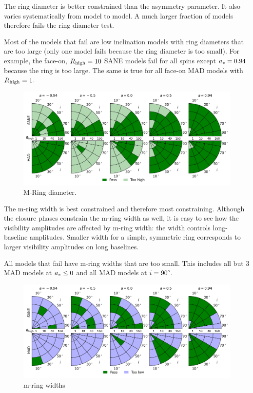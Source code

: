 
The ring diameter is better constrained than the asymmetry parameter.  It also varies systematically from model to model.  A much larger fraction of models therefore fails the ring diameter test.

Most of the models that fail are low inclination models with ring diameters that are too large (only one model fails because the ring diameter is too small).  For example, the face-on, $R_\mathrm{high} = 10$ SANE models fail for all spins except $a_* = 0.94$ because the ring is too large.  The same is true for all face-on MAD models with $R_\mathrm{high} = 1$.

\begin{figure}
  \centering
  \includegraphics[width=\textwidth]{./figures/Mring_d_Constraints.png}
  \caption{M-Ring diameter.}
  \label{fig:cmp_m-ring_diam}
\end{figure}

The m-ring width is best constrained and therefore most constraining.  Although the closure phases constrain the m-ring width as well, it is easy to see how the visibility amplitudes are affected by m-ring width: the width controls long-baseline amplitudes. Smaller width for a simple, symmetric ring corresponds to larger visibility amplitudes on long baselines.

All models that fail have m-ring widths that are too small.  This includes all but 3 MAD models at $a_* \le 0$ and all MAD models at $i = 90\degree$.

\begin{figure}
 \centering
 \includegraphics[width=\textwidth]{./figures/Mring_w_Constraints.png}
  \caption{m-ring widths}
\end{figure}

